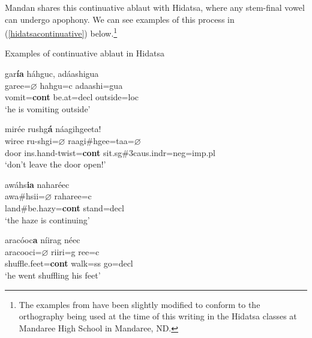 Mandan shares this continuative ablaut with Hidatsa, where any stem-final vowel can undergo apophony. We can see examples of this process in (\ref{hidatsacontinuative}) below.\footnote{The examples from \citet{park2012} have been slightly modified to conform to the orthography being used at the time of this writing in the Hidatsa classes at Mandaree High School in Mandaree, ND.}

\begin{exe}

\item\label{hidatsacontinuative} Examples of continuative ablaut in Hidatsa

	\begin{xlist}
	
	\item\label{hidatsacontinuative1} 
	
	\glll gar\textbf{ía} háhguc, adáashigua\\
	garee=$\varnothing$ hahgu=c adaashi=gua\\
	\textnormal{vomit}=\textbf{cont} \textnormal{be.at}=decl \textnormal{outside}=loc\\
	\glt `he is vomiting outside' \cite[53]{park2012}
	
	\item\label{hidatsacontinuative2}
	
	\glll mirée rushg\textbf{á} náagihgeeta!\\
	wiree ru-shgi=$\varnothing$ raagi\#hgee=taa=$\varnothing$\\
	\textnormal{door} ins.hand-\textnormal{twist}=\textbf{cont} \textnormal{sit}.sg\#3caus.indr=neg=imp.pl\\
	\glt `don't leave the door open!' \citep[215]{park2012}
	
	\item\label{hidatsacontinuative3}
	
	\glll awáhs\textbf{ia} naharéec\\
	awa\#hsii=$\varnothing$ raharee=c\\
	\textnormal{land}\#\textnormal{be.hazy}=\textbf{cont} \textnormal{stand}=decl\\
	\glt `the haze is continuing' \citep[269]{park2012}
	
	\item\label{hidatsacontinuative4}
	
	\glll aracóoc\textbf{a} níirag néec\\
	aracooci=$\varnothing$ riiri=g ree=c\\
	\textnormal{shuffle.feet}=\textbf{cont} \textnormal{walk}=ss \textnormal{go}=decl\\
	\glt `he went shuffling his feet' \citep[539]{park2012}
	

\end{xlist}
\end{exe}
